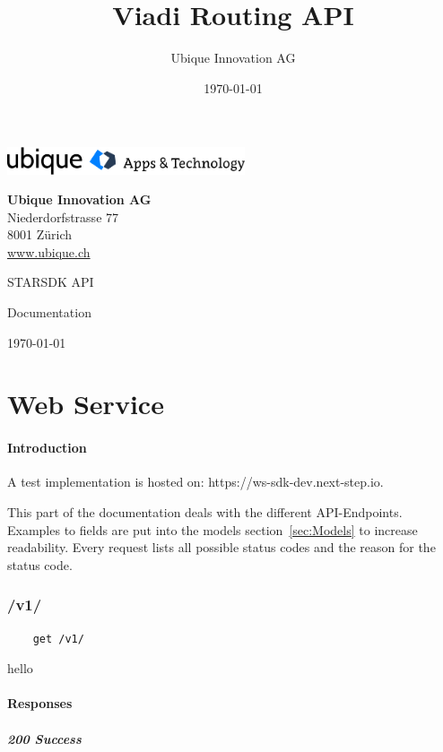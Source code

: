 \documentclass[a4paper
]{ubarticle}
\title{Viadi Routing API}
\date{\today}
\author{Ubique Innovation AG}
\begin{document}
\begin{titlepage}
	\includegraphics[width=7cm]{ubique-logo.png}
	\hspace{4.3cm}
 {\raggedleft
	 \textbf{Ubique Innovation AG} \\
	\hspace{11.5cm} Niederdorfstrasse 77 \\
	8001 Zürich \\
\vspace{0.3cm}
	\url{www.ubique.ch } 
\par}
	\vspace{3cm}
	{\Huge STARSDK API \par}
	\vspace{1.5cm}
	{\huge Documentation \par}
	\vspace{3cm}
	{ \large \today }
	\end{titlepage}
\thispagestyle{empty}
\clearpage
\tableofcontents
\clearpage

\part{Web Service}
\subsection{Introduction}
A test implementation is hosted on: https://ws-sdk-dev.next-step.io. 

This part of the documentation deals with the different API-Endpoints. Examples to fields are put into the models section~\ref{sec:Models} to increase readability. Every request lists all possible status codes and the reason for the status code.
\section{ /v1/ }
    \begin{verbatim}
    get /v1/
    \end{verbatim}
hello

\subsection{Responses}
\subsubsection{ 200 Success }
 
\end{document}
